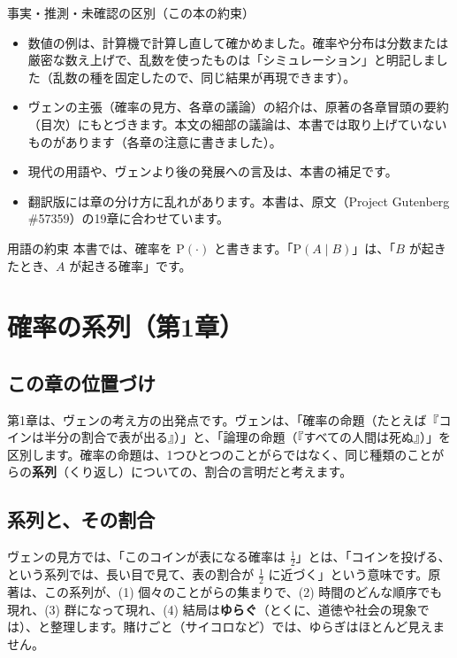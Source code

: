 \documentclass[a4paper,11pt,openany]{ltjsbook}
\newcommand{\Prob}{\mathrm{P}}
\begin{document}
\begin{notebox}{事実・推測・未確認の区別（この本の約束）}
\begin{itemize}[leftmargin=*]
\item 数値の例は、計算機で計算し直して確かめました。確率や分布は分数または厳密な数え上げで、乱数を使ったものは「シミュレーション」と明記しました（乱数の種を固定したので、同じ結果が再現できます）。
\item ヴェンの主張（確率の見方、各章の議論）の紹介は、原著の各章冒頭の要約（目次）にもとづきます。本文の細部の議論は、本書では取り上げていないものがあります（各章の注意に書きました）。
\item 現代の用語や、ヴェンより後の発展への言及は、本書の補足です。
\item 翻訳版には章の分け方に乱れがあります。本書は、原文（Project Gutenberg \#57359）の19章に合わせています。
\end{itemize}
\end{notebox}

\begin{pointbox}{用語の約束}
本書では、確率を $\Prob(\cdot)$ と書きます。「$\Prob(A\mid B)$」は、「$B$ が起きたとき、$A$ が起きる確率」です。

\end{pointbox}

\chapter{確率の系列（第1章）}

\section{この章の位置づけ}

第1章は、ヴェンの考え方の出発点です。ヴェンは、「確率の命題（たとえば『コインは半分の割合で表が出る』）」と、「論理の命題（『すべての人間は死ぬ』）」を区別します。確率の命題は、1つひとつのことがらではなく、同じ種類のことがらの\textbf{系列}（くり返し）についての、割合の言明だと考えます。

\section{系列と、その割合}

ヴェンの見方では、「このコインが表になる確率は $\tfrac12$」とは、「コインを投げる、という系列では、長い目で見て、表の割合が $\tfrac12$ に近づく」という意味です。原著は、この系列が、(1) 個々のことがらの集まりで、(2) 時間のどんな順序でも現れ、(3) 群になって現れ、(4) 結局は\textbf{ゆらぐ}（とくに、道徳や社会の現象では）、と整理します。賭けごと（サイコロなど）では、ゆらぎはほとんど見えません。
\end{document}
